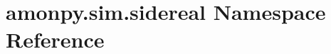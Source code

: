 \hypertarget{namespaceamonpy_1_1sim_1_1sidereal}{\section{amonpy.\-sim.\-sidereal Namespace Reference}
\label{namespaceamonpy_1_1sim_1_1sidereal}
}

